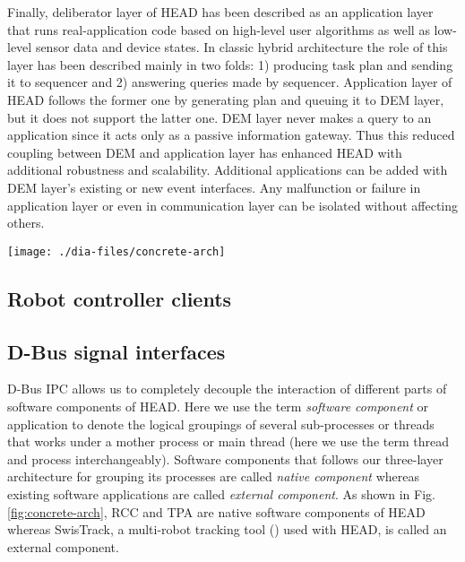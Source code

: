 Finally, deliberator layer of HEAD has been described as an application layer that runs real-application code based on high-level user algorithms as well as low-level sensor data and device states. In classic hybrid architecture the role of this layer has been described mainly in two folds: 1) producing task plan and sending it to sequencer and 2) answering queries made by sequencer. Application layer of HEAD follows the former one by generating plan and queuing it to DEM layer, but it does not support the latter one. DEM layer never makes a query to an application since it acts only as a passive information gateway. Thus this reduced coupling between DEM and application layer has enhanced HEAD with additional robustness and scalability. Additional applications can be added with DEM layer's existing or new event interfaces. Any malfunction or failure in application layer or even in communication layer can be isolated without affecting others. 
\begin{figure*}
\begin{center}
\texttt{[image: ./dia-files/concrete-arch]} %
\caption{General outline of {\em HEAD}. Robot-Controller-Client application has been splitted into two parts: one runs locally in server PC and another runs remotely, e.g., in embedded PC} 
\label{fig:concrete-arch}
\end{center}
\end{figure*}
\subsection{Robot controller clients}
\subsection{D-Bus signal interfaces}
D-Bus IPC allows us to completely decouple the interaction of different parts of software components of HEAD. Here we use the term {\em software component} or application to denote the logical groupings of several sub-processes or threads that works under a mother process or main thread (here we use the term thread and process interchangeably). Software components that follows our three-layer architecture for grouping its processes are called {\em native component} whereas existing software applications are called {\em external component}. As shown in Fig. \ref{fig:concrete-arch}, RCC and TPA are native software components of HEAD whereas SwisTrack, a multi-robot tracking tool (\cite{Lochmatter+2008}) used with HEAD, is called an external component.
